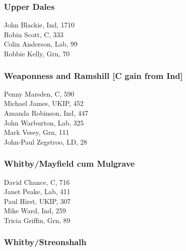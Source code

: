 \documentclass[a4paper,openany,10pt]{book}
\begin{document}
\subsubsection*{Upper Dales}



John Blackie, Ind, 1710\\
Robin Scott, C, 333\\
Colin Anderson, Lab, 99\\
Robbie Kelly, Grn, 70\\


\subsubsection*{Weaponness and Ramshill \hspace*{\fill}\nolinebreak[1]%
\enspace\hspace*{\fill}
[C gain from Ind]}



Penny Marsden, C, 590\\
Michael James, UKIP, 452\\
Amanda Robinson, Ind, 447\\
John Warburton, Lab, 325\\
Mark Vesey, Grn, 111\\
John-Paul Zegstroo, LD, 28\\


\subsubsection*{Whitby/Mayfield cum Mulgrave}



David Chance, C, 716\\
Janet Peake, Lab, 411\\
Paul Hirst, UKIP, 307\\
Mike Ward, Ind, 259\\
Tricia Griffin, Grn, 89\\


\subsubsection*{Whitby/Streonshalh}
\end{document}
